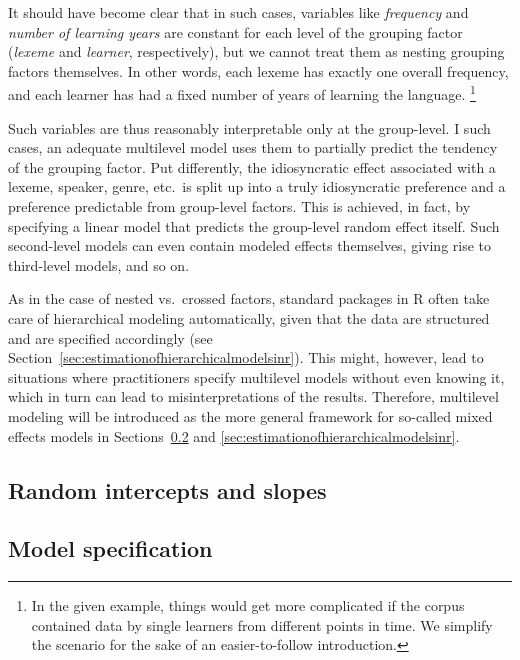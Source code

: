 \documentclass[a4paper,12pt]{article}
\begin{document}
It should have become clear that in such cases, variables like \textit{frequency} and \textit{number of learning years} are constant for each level of the grouping factor (\textit{lexeme} and \textit{learner}, respectively), but we cannot treat them as nesting grouping factors themselves.
In other words, each lexeme has exactly one overall frequency, and each learner has had a fixed number of years of learning the language.%
\footnote{In the given example, things would get more complicated if the corpus contained data by single learners from different points in time.
We simplify the scenario for the sake of an easier-to-follow introduction.}

Such variables are thus reasonably interpretable only at the group-level.
I such cases, an adequate multilevel model uses them to partially predict the tendency of the grouping factor.
Put differently, the idiosyncratic effect associated with a lexeme, speaker, genre, etc.\ is split up into a truly idiosyncratic preference and a preference predictable from group-level factors.
This is achieved, in fact, by specifying a linear model that predicts the group-level random effect itself.
Such second-level models can even contain modeled effects themselves, giving rise to third-level models, and so on.

As in the case of nested vs.\ crossed factors, standard packages in R often take care of hierarchical modeling automatically, given that the data are structured and are specified accordingly (see Section~\ref{sec:estimationofhierarchicalmodelsinr}).
This might, however, lead to situations where practitioners specify multilevel models without even knowing it, which in turn can lead to misinterpretations of the results.
Therefore, multilevel modeling will be introduced as the more general framework for so-called mixed effects models in Sections~\ref{sec:modelspecification} and \ref{sec:estimationofhierarchicalmodelsinr}.

\subsection{Random intercepts and slopes}
\label{sec:randominterceptsandslopes}

\subsection{Model specification}
\label{sec:modelspecification}

\end{document}
